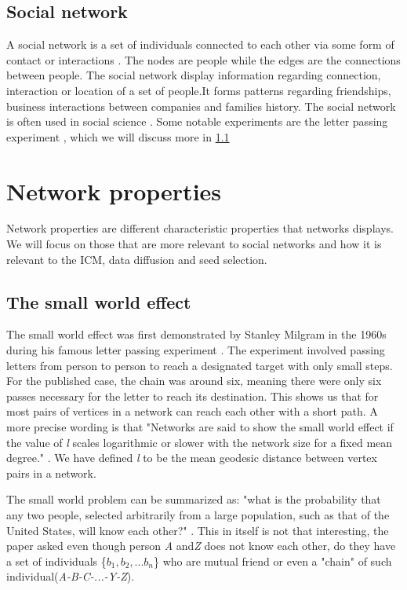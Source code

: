 \subsection{Social network}
A social network is a set of individuals connected to each other via some form of contact or interactions \cite{ComplexNetwork2003}. The nodes are people while the edges are the connections between people. The social network display information regarding connection, interaction or location of a set of people.It forms patterns regarding friendships, business interactions between companies and families history. The social network is often used in social science \cite{ComplexNetwork2003}. Some notable experiments are the letter passing experiment \cite{smallWorldExperiment1969}, which we will discuss more in \ref{sec:SmallWorldeffect} 

\section{Network properties}
Network properties are different characteristic properties that networks displays. We will focus on those that are more relevant to social networks and how it is relevant to the ICM, data diffusion and seed selection.


\subsection{The small world effect} \label{sec:SmallWorldeffect}
The small world effect was first demonstrated by Stanley Milgram in the 1960s during his famous letter passing experiment \cite{SmallWorldProblemSmilgram1960}. The experiment involved passing letters from person to person to reach a designated target with only small steps. For the published case, the chain was around six\cite{Experiment1969}, meaning there were only six passes necessary for the letter to reach its destination. This shows us that for most pairs of vertices in a network can reach each other with a short path. A more precise wording is that "Networks are said to show the small world effect if the value of \textit{l} scales logarithmic or slower with the network size for a fixed mean degree." \cite{ComplexNetwork2003}. We have defined \textit{l}  to be the mean geodesic distance between vertex pairs in a network.

The small world problem can be summarized as: "what is the probability that any two people, selected arbitrarily from a large population, such as that of the United States, will know each other?" \cite{Experiment1969}. This in itself is not that interesting, the paper \cite{Experiment1969} asked even though  person \textit{A} and\textit{Z} does not know each other, do they have a set of individuals \{$b_1, b_2, ... b_n $\} who are mutual friend or even a "chain" of such individual(\textit {A-B-C-...-Y-Z}).

